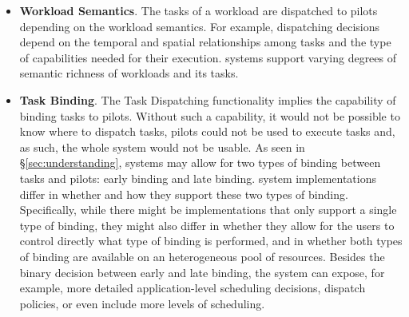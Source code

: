\documentclass{sig-alternate}
\begin{document}
\begin{itemize}
\item \textbf{Workload Semantics}. The tasks of a workload are dispatched to
  pilots depending on the workload semantics. For example, dispatching decisions
  depend on the temporal and spatial relationships among tasks and the type of
  capabilities needed for their execution. \pilot systems support varying
  degrees of semantic richness of workloads and its tasks.






\item \textbf{Task Binding}. The Task Dispatching functionality implies the
  capability of binding tasks to pilots. Without such a capability, it would not
  be possible to know where to dispatch tasks, pilots could not be used to
  execute tasks and, as such, the whole \pilot system would not be usable. As
  seen in \S\ref{sec:understanding}, \pilot systems may allow for two types of
  binding between tasks and pilots: early binding and late binding. \pilot
  system implementations differ in whether and how they support these two types
  of binding. Specifically, while there might be implementations that only
  support a single type of binding, they might also differ in whether they allow
  for the users to control directly what type of binding is performed, and in
  whether both types of binding are available on an heterogeneous pool of
  resources. Besides the binary decision between early and late binding, the
  \pilot system can expose, for example, more detailed application-level
  scheduling decisions, dispatch policies, or even include more levels of
  scheduling.


\end{itemize}
\end{document}
